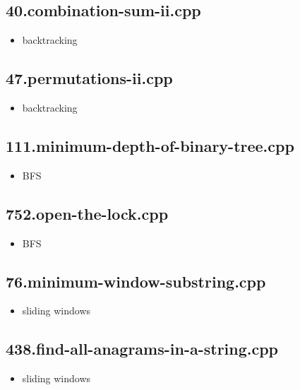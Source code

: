 \subsection{40.combination-sum-ii.cpp}

\begin{itemize}
	\item backtracking
\end{itemize}

\subsection{47.permutations-ii.cpp}

\begin{itemize}
	\item backtracking
\end{itemize}

\subsection{111.minimum-depth-of-binary-tree.cpp}

\begin{itemize}
	\item BFS
\end{itemize}

\subsection{752.open-the-lock.cpp}

\begin{itemize}
	\item BFS
\end{itemize}

\subsection{76.minimum-window-substring.cpp}

\begin{itemize}
	\item sliding windows
\end{itemize}

\subsection{438.find-all-anagrams-in-a-string.cpp}

\begin{itemize}
	\item sliding windows
\end{itemize}

